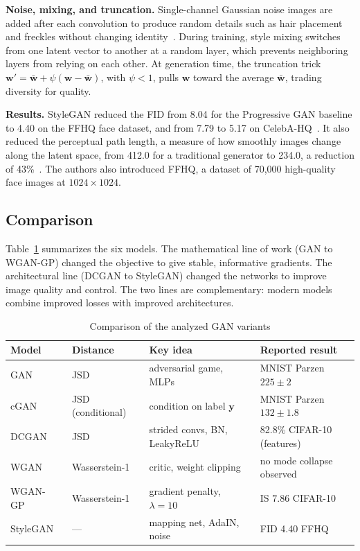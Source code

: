 \documentclass[conference]{IEEEtran}
\begin{document}
\textbf{Noise, mixing, and truncation.} Single-channel Gaussian noise images are added after each convolution to produce random details such as hair placement and freckles without changing identity~\cite{karras2019}. During training, style mixing switches from one latent vector to another at a random layer, which prevents neighboring layers from relying on each other. At generation time, the truncation trick $\mathbf{w}'=\bar{\mathbf{w}}+\psi(\mathbf{w}-\bar{\mathbf{w}})$, with $\psi<1$, pulls $\mathbf{w}$ toward the average $\bar{\mathbf{w}}$, trading diversity for quality.

\textbf{Results.} StyleGAN reduced the FID from 8.04 for the Progressive GAN baseline to 4.40 on the FFHQ face dataset, and from 7.79 to 5.17 on CelebA-HQ~\cite{karras2019}. It also reduced the perceptual path length, a measure of how smoothly images change along the latent space, from 412.0 for a traditional generator to 234.0, a reduction of 43\%~\cite{karras2019}. The authors also introduced FFHQ, a dataset of 70,000 high-quality face images at $1024\times1024$.

\subsection{Comparison}
Table~\ref{tab:compare} summarizes the six models. The mathematical line of work (GAN to WGAN-GP) changed the objective to give stable, informative gradients. The architectural line (DCGAN to StyleGAN) changed the networks to improve image quality and control. The two lines are complementary: modern models combine improved losses with improved architectures.

\begin{table}[t]
\centering
\caption{Comparison of the analyzed GAN variants}
\label{tab:compare}
\setlength{\tabcolsep}{2.5pt}
\begin{tabular}{llp{2.3cm}p{2.1cm}}
\toprule
Model & Distance & Key idea & Reported result \\
\midrule
GAN~\cite{goodfellow2014} & JSD & adversarial game, MLPs & MNIST Parzen $225\pm2$ \\
cGAN~\cite{mirza2014} & JSD (conditional) & condition on label $\mathbf{y}$ & MNIST Parzen $132\pm1.8$ \\
DCGAN~\cite{radford2016} & JSD & strided convs, BN, LeakyReLU & 82.8\% CIFAR-10 (features) \\
WGAN~\cite{arjovsky2017} & Wasserstein-1 & critic, weight clipping & no mode collapse observed \\
WGAN-GP~\cite{gulrajani2017} & Wasserstein-1 & gradient penalty, $\lambda=10$ & IS $7.86$ CIFAR-10 \\
StyleGAN~\cite{karras2019} & --- & mapping net, AdaIN, noise & FID 4.40 FFHQ \\
\bottomrule
\end{tabular}
\end{table}
\end{document}
